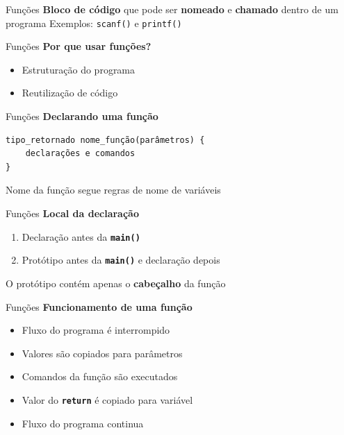 \documentclass[10pt]{beamer}
\subtitle{Aula 3}
\date{06 de novembro de 2019}
\begin{document}
\maketitle

\begin{frame}{Funções}
  \huge
  \textbf{Bloco de código} que pode ser \textbf{nomeado} e \textbf{chamado} dentro de um programa
  \vfill
  \LARGE
  Exemplos: \texttt{scanf()} e \texttt{printf()}
\end{frame}

\begin{frame}{Funções}
  \huge
  \textbf{Por que usar funções?}
  \vfill
  \begin{itemize}
    \item Estruturação do programa
    \item Reutilização de código
  \end{itemize}
\end{frame}

\begin{frame}[fragile]{Funções}
  \huge
  \textbf{Declarando uma função}
  \vfill
  \large
  \begin{verbatim}
tipo_retornado nome_função(parâmetros) {
    declarações e comandos
}
  \end{verbatim}

  Nome da função segue regras de nome de variáveis
\end{frame}

\begin{frame}[fragile]{Funções}
  \huge
  \textbf{Local da declaração}
  \vfill
  \large
  \begin{enumerate}
    \item Declaração antes da \textbf{\texttt{main()}}
    \item Protótipo antes da \textbf{\texttt{main()}} e declaração depois
  \end{enumerate}
  \vfill
  \large
  O protótipo contém apenas o \textbf{cabeçalho} da função
\end{frame}

\begin{frame}{Funções}
  \huge
  \textbf{Funcionamento de uma função}
  \vfill
  \Large
  \begin{itemize}
    \item Fluxo do programa é interrompido
    \item Valores são copiados para parâmetros
    \item Comandos da função são executados
    \item Valor do \texttt{\textbf{return}} é copiado para variável
    \item Fluxo do programa continua
  \end{itemize}
\end{frame}
\end{document}
